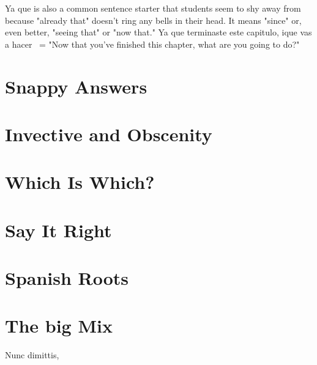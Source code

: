 \documentclass[14pt,a4paper,oneside]{memoir}
\begin{document}
Ya que is also a common sentence starter that students seem
to shy away from because "already that" doesn't ring any bells in their
head. It means "since" or, even better, "seeing that" or "now that." Ya
que terminaste este capitulo, ique vas a hacer~ = "Now that you've
finished this chapter, what are you going to do?"

\chapter{Snappy Answers}

\section{\emph{}}
\section{\emph{}}
\section{\emph{}}
\chapter{Invective and Obscenity}

\chapter{Which Is Which?}

\chapter{Say It Right}

\chapter{Spanish Roots}

\chapter{The big Mix}


\begin{flushright}
    {\tiny{Nunc dimittis}, \DTMnow}
\end{flushright}
\end{document}
